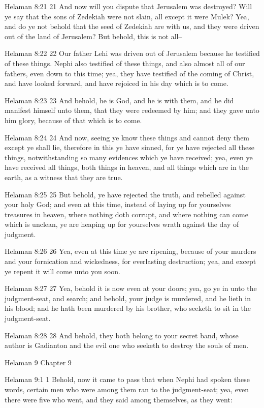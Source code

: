 Helaman 8:21
 21 And now will you dispute that Jerusalem was destroyed? Will
ye say that the sons of Zedekiah were not slain, all except it
were Mulek? Yea, and do ye not behold that the seed of Zedekiah
are with us, and they were driven out of the land of Jerusalem?
But behold, this is not all--

Helaman 8:22
 22 Our father Lehi was driven out of Jerusalem because he
testified of these things. Nephi also testified of these things,
and also almost all of our fathers, even down to this time; yea,
they have testified of the coming of Christ, and have looked
forward, and have rejoiced in his day which is to come.

Helaman 8:23
 23 And behold, he is God, and he is with them, and he did
manifest himself unto them, that they were redeemed by him; and
they gave unto him glory, because of that which is to come.

Helaman 8:24
 24 And now, seeing ye know these things and cannot deny them
except ye shall lie, therefore in this ye have sinned, for ye
have rejected all these things, notwithstanding so many evidences
which ye have received; yea, even ye have received all things,
both things in heaven, and all things which are in the earth, as
a witness that they are true.

Helaman 8:25
 25 But behold, ye have rejected the truth, and rebelled against
your holy God; and even at this time, instead of laying up for
yourselves treasures in heaven, where nothing doth corrupt, and
where nothing can come which is unclean, ye are heaping up for
yourselves wrath against the day of judgment.

Helaman 8:26
 26 Yea, even at this time ye are ripening, because of your
murders and your fornication and wickedness, for everlasting
destruction; yea, and except ye repent it will come unto you
soon.

Helaman 8:27
 27 Yea, behold it is now even at your doors; yea, go ye in unto
the judgment-seat, and search; and behold, your judge is
murdered, and he lieth in his blood; and he hath been murdered by
his brother, who seeketh to sit in the judgment-seat.

Helaman 8:28
 28 And behold, they both belong to your secret band, whose
author is Gadianton and the evil one who seeketh to destroy the
souls of men.

Helaman 9
Chapter 9

Helaman 9:1
 1 Behold, now it came to pass that when Nephi had spoken these
words, certain men who were among them ran to the judgment-seat;
yea, even there were five who went, and they said among
themselves, as they went:


